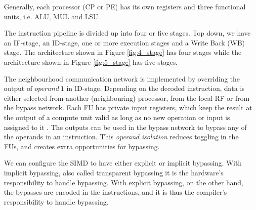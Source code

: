 Generally, each processor (CP or PE) has its own registers and three functional units, i.e. ALU, MUL and LSU. 

The instruction pipeline is divided up into four or five stages. Top down, we have an IF-stage, an ID-stage, one or more execution stages and a Write Back (WB) stage. The architecture shown in Figure \ref{fig:4_stage} has four stages while the architecture shown in Figure \ref{fig:5_stage} has five stages.

The neighbourhood communication network is implemented by overriding the output of $operand\ 1$ in ID-stage. Depending on the decoded instruction, data is either selected from another (neighbouring) processor, from the local RF or from the bypass network. Each FU has private input registers, which keep the result at the output of a compute unit valid as long as no new operation or input is assigned to it \cite{dongrio1}. The outputs can be used in the bypass network to bypass any of the operands in an instruction. This \emph{operand isolation} reduces toggling in the FUs, and creates extra opportunities for bypassing.

We can configure the SIMD to have either explicit or implicit bypassing. With implicit bypassing, also called transparent bypassing it is the hardware's responsibility to handle bypassing. With explicit bypassing, on the other hand, the bypasses are encoded in the instructions, and it is thus the compiler's responsibility to handle bypassing.



